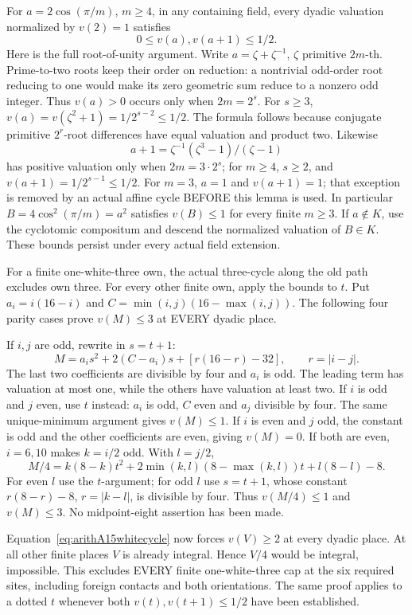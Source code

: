 \documentclass[11pt]{article}
\begin{document}
For \(a=2\cos(\pi/m)\), \(m\ge4\), in any containing field,
every dyadic valuation normalized by \(v(2)=1\) satisfies
\[
                         0\le v(a),v(a+1)\le1/2 .
\]
Here is the full root-of-unity argument.
Write \(a=\zeta+\zeta^{-1}\), \(\zeta\) primitive \(2m\)-th.
Prime-to-two roots keep their order on reduction: a nontrivial
odd-order root reducing to one would make its zero geometric
sum reduce to a nonzero odd integer.
Thus \(v(a)>0\) occurs only when \(2m=2^s\).
For \(s\ge3\),
\(v(a)=v(\zeta^2+1)=1/2^{s-2}\le1/2\).
The formula follows because conjugate primitive \(2^r\)-root
differences have equal valuation and product two.
Likewise
\[
                a+1=\zeta^{-1}(\zeta^3-1)/(\zeta-1)
\]
has positive valuation only when \(2m=3\cdot2^s\);
for \(m\ge4\), \(s\ge2\), and
\(v(a+1)=1/2^{s-1}\le1/2\).
For \(m=3\), \(a=1\) and \(v(a+1)=1\); that exception is
removed by an actual affine cycle BEFORE this lemma is used.
In particular \(B=4\cos^2(\pi/m)=a^2\) satisfies \(v(B)\le1\)
for every finite \(m\ge3\).
If \(a\notin K\), use the cyclotomic compositum and descend
the normalized valuation of \(B\in K\).
These bounds persist under every actual field extension.

For a finite one-white-three own, the actual three-cycle
along the old path excludes own three.
For every other finite own, apply the bounds to \(t\).
Put \(a_i=i(16-i)\) and \(C=\min(i,j)(16-\max(i,j))\).
The following four parity cases prove \(v(M)\le3\)
at EVERY dyadic place.

If \(i,j\) are odd, rewrite in \(s=t+1\):
\[
 M=a_is^2+2(C-a_i)s+[r(16-r)-32],\qquad r=|i-j|.
\]
The last two coefficients are divisible by four and \(a_i\)
is odd.  The leading term has valuation at most one, while
the others have valuation at least two.
If \(i\) is odd and \(j\) even, use \(t\) instead:
\(a_i\) is odd, \(C\) even and \(a_j\) divisible by four.
The same unique-minimum argument gives \(v(M)\le1\).
If \(i\) is even and \(j\) odd, the constant is odd and the
other coefficients are even, giving \(v(M)=0\).
If both are even, \(i=6,10\) makes \(k=i/2\) odd.
With \(l=j/2\),
\[
 M/4=k(8-k)t^2+2\min(k,l)(8-\max(k,l))t+l(8-l)-8 .
\]
For even \(l\) use the \(t\)-argument; for odd \(l\) use
\(s=t+1\), whose constant
\(r(8-r)-8\), \(r=|k-l|\), is divisible by four.
Thus \(v(M/4)\le1\) and \(v(M)\le3\).
No midpoint-eight assertion has been made.

Equation~\eqref{eq:arithA15whitecycle} now forces \(v(V)\ge2\)
at every dyadic place.
At all other finite places \(V\) is already integral.
Hence \(V/4\) would be integral, impossible.
This excludes EVERY finite one-white-three cap at the six
required sites, including foreign contacts and both orientations.
The same proof applies to a dotted \(t\) whenever both
\(v(t),v(t+1)\le1/2\) have been established.
\end{document}
